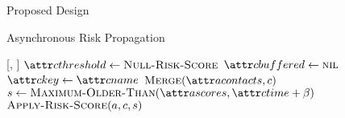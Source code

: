 \documentclass[11pt]{beamer}
\begin{document}
\begin{section}{Proposed Design}
\begin{frame}{Asynchronous Risk Propagation}
\begin{function}{\nHandleContact}[\vActor, \vContact]
    \pause
    \State $\aContactThreshold \assign \cNullRiskScore$
    \pause
    \State $\aContactBuffered \assign \nil$
    \pause
    \State $\aContactKey \assign \aContactName$
    \pause
    \State $\cMerge[\aActorContacts, \vContact]$
    \pause
    \State $\vScore \assign \cMaximumOlderThan[\aActorScores, \aContactTime + \pTimeBuffer]$
    \pause
    \State $\cApplyRiskScore[\vActor, \vContact, \vScore]$
  \EndIf
\end{function}
\end{frame}

\end{section}
\end{document}
